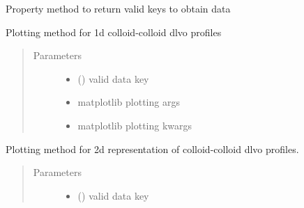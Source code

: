 \documentclass[letterpaper,10pt,english]{sphinxmanual}
\begin{document}
\begin{fulllineitems}
\begin{fulllineitems}
\begin{quote}
\begin{description}
\end{description}\end{quote}

\end{fulllineitems}


\begin{fulllineitems}
\label{\detokenize{index:lb_colloids.Colloids.Colloid_output.CCModelPlot.keys}}
Property method to return valid keys to obtain data

\end{fulllineitems}


\begin{fulllineitems}
\label{\detokenize{index:lb_colloids.Colloids.Colloid_output.CCModelPlot.plot}}
Plotting method for 1d colloid-colloid dlvo profiles
\begin{quote}\begin{description}
\item[{Parameters}] \leavevmode\begin{itemize}
\item {} 
 () \textendash{} valid data key

\item {} 
 \textendash{} 
matplotlib plotting args


\item {} 
 \textendash{} 
matplotlib plotting kwargs


\end{itemize}

\end{description}\end{quote}

\end{fulllineitems}


\begin{fulllineitems}
\label{\detokenize{index:lb_colloids.Colloids.Colloid_output.CCModelPlot.plot_mesh}}
Plotting method for 2d representation of colloid-colloid
dlvo profiles.
\begin{quote}\begin{description}
\item[{Parameters}] \leavevmode\begin{itemize}
\item {} 
 () \textendash{} valid data key


\end{itemize}
\end{description}
\end{quote}
\end{fulllineitems}
\end{fulllineitems}
\end{document}

